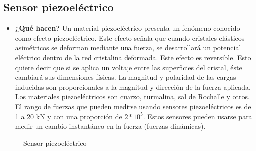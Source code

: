 \begin{figure}[h]
	\centering
\end{figure}


	\subsection*{Sensor piezoeléctrico}
\begin{itemize}
	\item \textbf{¿Qué hacen?} 
	Un material piezoeléctrico presenta un fenómeno conocido como efecto piezoeléctrico. Este efecto señala que cuando cristales elásticos asimétricos se deforman mediante una fuerza, se desarrollará un potencial eléctrico dentro de la red cristalina deformada. Este efecto es reversible. Esto quiere decir que si se aplica un voltaje entre las superficies del cristal, éste cambiará sus dimensiones físicas. La magnitud y polaridad de las cargas inducidas son proporcionales a la magnitud y dirección de la fuerza aplicada. Los materiales piezoeléctricos son cuarzo, turmalina, sal de Rochalle y otros. El rango de fuerzas que pueden medirse usando sensores piezoeléctricos es de 1 a 20 kN y con una proporción de $2*10^{5}.$ 
	Estos sensores pueden usarse para medir un cambio instantáneo en la fuerza (fuerzas dinámicas). \cite{IngMecafenix_SensorPiezoelectrico}
	
\end{itemize}

\begin{figure}[h]
	\centering
	\hfill
	\caption{Sensor piezoeléctrico}
	\label{fig:mascotas}
\end{figure}

\vspace{15cm}